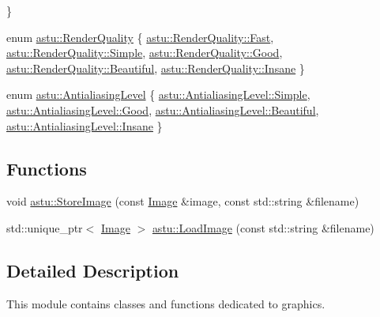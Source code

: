 \begin{DoxyCompactItemize}
 \}
\item 
enum \hyperlink{group__gfx__group_gac3b4955f341cea44f53f8446d734cd54}{astu\+::\+Render\+Quality} \{ \newline
\hyperlink{group__gfx__group_ggac3b4955f341cea44f53f8446d734cd54ae16b5b7f26f54214445cbe38d72c2828}{astu\+::\+Render\+Quality\+::\+Fast}, 
\hyperlink{group__gfx__group_ggac3b4955f341cea44f53f8446d734cd54a1fbb1e3943c2c6c560247ac8f9289780}{astu\+::\+Render\+Quality\+::\+Simple}, 
\hyperlink{group__gfx__group_ggac3b4955f341cea44f53f8446d734cd54a0c6ad70beb3a7e76c3fc7adab7c46acc}{astu\+::\+Render\+Quality\+::\+Good}, 
\hyperlink{group__gfx__group_ggac3b4955f341cea44f53f8446d734cd54a9c8c29335006d9e40eef25192524c99f}{astu\+::\+Render\+Quality\+::\+Beautiful}, 
\newline
\hyperlink{group__gfx__group_ggac3b4955f341cea44f53f8446d734cd54a77529ad508ab7d3b5a99adc7e711040b}{astu\+::\+Render\+Quality\+::\+Insane}
 \}
\item 
enum \hyperlink{group__gfx__group_ga7bcac32f8bae9bfd1f21655d4734efe8}{astu\+::\+Antialiasing\+Level} \{ \hyperlink{group__gfx__group_gga7bcac32f8bae9bfd1f21655d4734efe8a1fbb1e3943c2c6c560247ac8f9289780}{astu\+::\+Antialiasing\+Level\+::\+Simple}, 
\hyperlink{group__gfx__group_gga7bcac32f8bae9bfd1f21655d4734efe8a0c6ad70beb3a7e76c3fc7adab7c46acc}{astu\+::\+Antialiasing\+Level\+::\+Good}, 
\hyperlink{group__gfx__group_gga7bcac32f8bae9bfd1f21655d4734efe8a9c8c29335006d9e40eef25192524c99f}{astu\+::\+Antialiasing\+Level\+::\+Beautiful}, 
\hyperlink{group__gfx__group_gga7bcac32f8bae9bfd1f21655d4734efe8a77529ad508ab7d3b5a99adc7e711040b}{astu\+::\+Antialiasing\+Level\+::\+Insane}
 \}
\end{DoxyCompactItemize}
\subsection*{Functions}
\begin{DoxyCompactItemize}
\item 
void \hyperlink{group__gfx__group_gaca5f9cb8047c60049300242c20d30cd6}{astu\+::\+Store\+Image} (const \hyperlink{classastu_1_1Image}{Image} \&image, const std\+::string \&filename)
\item 
std\+::unique\+\_\+ptr$<$ \hyperlink{classastu_1_1Image}{Image} $>$ \hyperlink{group__gfx__group_ga46ac561eac42d4ace785797db8bc89a0}{astu\+::\+Load\+Image} (const std\+::string \&filename)
\end{DoxyCompactItemize}


\subsection{Detailed Description}
This module contains classes and functions dedicated to graphics. 



